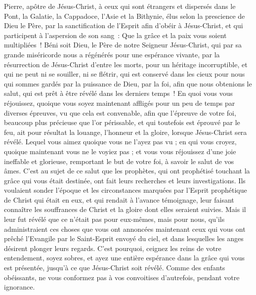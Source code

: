 \begin{multicols}{2}
\VerseOne{}Pierre, apôtre de Jésus-Christ, à ceux qui sont étrangers et dispersés dans le Pont, la Galatie, la Cappadoce, l'Asie et la Bithynie,
élus selon la prescience de Dieu le Père, par la sanctification de l'Esprit afin d'obéir à Jésus-Christ, et qui participent à l'aspersion de son sang~: Que la grâce et la paix vous soient multipliées~!
Béni soit Dieu, le Père de notre Seigneur Jésus-Christ, qui par sa grande miséricorde nous a régénérés pour une espérance vivante, par la résurrection de Jésus-Christ d'entre les morts,
pour un héritage incorruptible, et qui ne peut ni se souiller, ni se flétrir, qui est conservé dans les cieux pour nous
qui sommes gardés par la puissance de Dieu, par la foi, afin que nous obtenions le salut, qui est prêt à être révélé dans les derniers temps~!
En quoi vous vous réjouissez, quoique vous soyez maintenant affligés pour un peu de temps par diverses épreuves, vu que cela est convenable,
afin que l'épreuve de votre foi, beaucoup plus précieuse que l'or périssable, et qui toutefois est éprouvé par le feu, ait pour résultat la louange, l'honneur et la gloire, lorsque Jésus-Christ sera révélé.
Lequel vous aimez quoique vous ne l'ayez pas vu ; en qui vous croyez, quoique maintenant vous ne le voyiez pas ; et vous vous réjouissez d'une joie ineffable et glorieuse,
remportant le but de votre foi, à savoir le salut de vos âmes.
C'est au sujet de ce salut que les prophètes, qui ont prophétisé touchant la grâce qui vous était destinée, ont fait leurs recherches et leurs investigations.
Ils voulaient sonder l'époque et les circonstances marquées par l'Esprit prophétique de Christ qui était en eux, et qui rendait à l'avance témoignage, leur faisant connaître les souffrances de Christ et la gloire dont elles seraient suivies.
Mais il leur fut révélé que ce n'était pas pour eux-mêmes, mais pour nous, qu'ils administraient ces choses que vous ont annoncées maintenant ceux qui vous ont prêché l'Evangile par le Saint-Esprit envoyé du ciel, et dans lesquelles les anges désirent plonger leurs regards.
C'est pourquoi, ceignez les reins de votre entendement, soyez sobres, et ayez une entière espérance dans la grâce qui vous est présentée, jusqu'à ce que Jésus-Christ soit révélé.
Comme des enfants obéissants, ne vous conformez pas à vos convoitises d'autrefois, pendant votre ignorance. 

\end{multicols}
